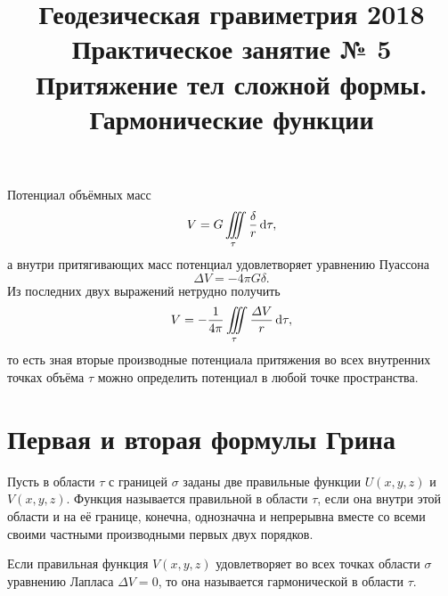 \documentclass[11pt, a4paper]{article}
\title{{\Large Геодезическая гравиметрия 2018}\\ 
    {\bf\Large Практическое занятие № 5} \\
{\Large Притяжение тел сложной формы. Гармонические функции}}
\author{}
\date{\DTMusedate{lessondate}}
\theoremstyle{plain}
\theoremstyle{definition}
\theoremstyle{remark}
\begin{document}
\maketitle

Потенциал объёмных масс
\begin{equation}
    V = G\iiint\limits_\tau \dfrac{\delta}{r}\dif \tau,
\end{equation}
а внутри притягивающих масс потенциал удовлетворяет уравнению Пуассона
\begin{equation}
    \label{eq:poisson}
    \Delta V = -4\pi G\delta.
\end{equation}
Из последних двух выражений нетрудно получить
\begin{equation}
    \label{eq:poissonvol}
    V = -\dfrac{1}{4\pi}\iiint\limits_\tau \dfrac{\Delta V}{r} \dif\tau,
\end{equation}
то есть зная вторые производные потенциала притяжения во всех внутренних точках объёма $\tau$ можно
определить потенциал в любой точке пространства.

\section{Первая и вторая формулы Грина}
Пусть в области $\tau$ с границей $\sigma$ заданы две правильные функции $U\left( x, y, z \right)$ и
$V \left( x, y, z \right)$. Функция называется правильной в области $\tau$, если она внутри этой
области и на её границе, конечна, однозначна и непрерывна вместе со всеми своими частными
производными первых двух порядков. \par

Если правильная функция $V \left( x, y, z \right)$ удовлетворяет во всех точках области $\sigma$
уравнению Лапласа $\Delta V = 0$, то она называется гармонической в области $\tau$. 
\end{document}
